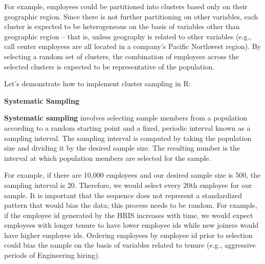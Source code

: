 \documentclass[]{book}
\newenvironment{Shaded}{\begin{snugshade}}{\end{snugshade}}
\newcommand{\CommentTok}[1]{\textcolor[rgb]{0.56,0.35,0.01}{\textit{#1}}}
\newcommand{\DataTypeTok}[1]{\textcolor[rgb]{0.13,0.29,0.53}{#1}}
\newcommand{\DecValTok}[1]{\textcolor[rgb]{0.00,0.00,0.81}{#1}}
\newcommand{\KeywordTok}[1]{\textcolor[rgb]{0.13,0.29,0.53}{\textbf{#1}}}
\newcommand{\NormalTok}[1]{#1}
\newcommand{\OperatorTok}[1]{\textcolor[rgb]{0.81,0.36,0.00}{\textbf{#1}}}
\newcommand{\StringTok}[1]{\textcolor[rgb]{0.31,0.60,0.02}{#1}}
\begin{document}
For example, employees could be partitioned into clusters based only on their geographic region. Since there is not further partitioning on other variables, each cluster is expected to be heterogeneous on the basis of variables other than geographic region -- that is, unless geography is related to other variables (e.g., call center employees are all located in a company's Pacific Northwest region). By selecting a random set of clusters, the combination of employees across the selected clusters is expected to be representative of the population.

Let's demonstrate how to implement cluster sampling in R:

\begin{Shaded}
\end{Shaded}

\textbf{Systematic Sampling}

\textbf{Systematic sampling} involves selecting sample members from a population according to a random starting point and a fixed, periodic interval known as a sampling interval. The sampling interval is computed by taking the population size and dividing it by the desired sample size. The resulting number is the interval at which population members are selected for the sample.

For example, if there are 10,000 employees and our desired sample size is 500, the sampling interval is 20. Therefore, we would select every 20th employee for our sample. It is important that the sequence does not represent a standardized pattern that would bias the data; this process needs to be random. For example, if the employee id generated by the HRIS increases with time, we would expect employees with longer tenure to have lower employee ids while new joiners would have higher employee ids. Ordering employees by employee id prior to selection could bias the sample on the basis of variables related to tenure (e.g., aggressive periods of Engineering hiring).
\end{document}
